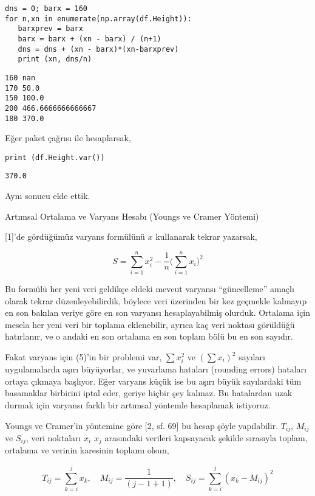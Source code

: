 \documentclass[12pt,fleqn]{article}\usepackage{../../common}
\begin{document}
\begin{verbatim}
dns = 0; barx = 160
for n,xn in enumerate(np.array(df.Height)):
   barxprev = barx
   barx = barx + (xn - barx) / (n+1)
   dns = dns + (xn - barx)*(xn-barxprev)
   print (xn, dns/n)
\end{verbatim}

\begin{verbatim}
160 nan
170 50.0
150 100.0
200 466.6666666666667
180 370.0
\end{verbatim}

Eğer paket çağrısı ile hesaplarsak, 

\begin{verbatim}
print (df.Height.var())   
\end{verbatim}

\begin{verbatim}
370.0
\end{verbatim}

Aynı sonucu elde ettik. 

Artımsal Ortalama ve Varyans Hesabı (Youngs ve Cramer Yöntemi)

[1]'de gördüğümüz varyans formülünü $x$ kullanarak tekrar yazarsak,

$$ 
S = \sum _{i=1}^{n} x_i^2 - \frac{1}{n} \bigg( \sum _{i=1}^{n} x_i \bigg)^2  
$$

Bu formülü her yeni veri geldikçe eldeki mevcut varyansı ``güncelleme''
amaçlı olarak tekrar düzenleyebilirdik, böylece veri üzerinden bir kez
geçmekle kalmayıp en son bakılan veriye göre en son varyansı
hesaplayabilmiş olurduk. Ortalama için mesela her yeni veri bir toplama
eklenebilir, ayrıca kaç veri noktası görüldüğü hatırlanır, ve o andaki en
son ortalama en son toplam bölü bu en son sayıdır. 

Fakat varyans için (5)'in bir problemi var, $\sum x_i^2$ ve $(\sum x_i)^2$
sayıları uygulamalarda aşırı büyüyorlar, ve yuvarlama hataları (rounding
errors) hataları ortaya çıkmaya başlıyor. Eğer varyans küçük ise bu aşırı
büyük sayılardaki tüm basamaklar birbirini iptal eder, geriye hiçbir şey
kalmaz. Bu hatalardan uzak durmak için varyansı farklı bir artımsal
yöntemle hesaplamak istiyoruz.

Youngs ve Cramer'in yöntemine göre [2, sf. 69] bu hesap şöyle
yapılabilir. $T_{ij}$, $M_{ij}$ ve $S_{ij}$, veri noktaları $x_i$ $x_j$
arasındaki verileri kapsayacak şekilde sırasıyla toplam, ortalama ve verinin
karesinin toplamı olsun,

$$ 
T_{ij} = \sum _{k=i}^{j} x_k , \quad  
M_{ij} = \frac{1}{(j-1+1)}, \quad
S_{ij} = \sum _{k=i}^{j} (x_k - M_{ij})^2
$$
\end{document}
